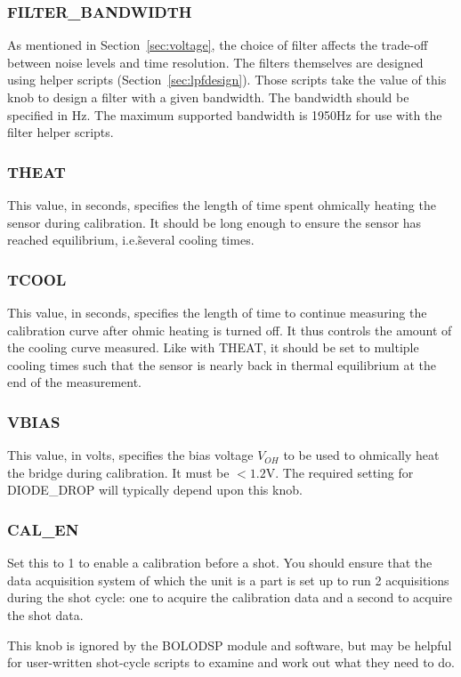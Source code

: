 \documentclass[12pt,a4paper]{article}
\begin{document}
\subsubsection{FILTER{\_}BANDWIDTH}
As mentioned in Section~\ref{sec:voltage}, the choice of filter affects the trade-off between noise levels and time resolution. The filters themselves are
designed using helper scripts (Section~\ref{sec:lpfdesign}). Those scripts take the value of this knob to design a filter with a given bandwidth. The
bandwidth should be specified in Hz. The maximum supported bandwidth is 1950Hz for use with the filter helper scripts.

\subsubsection{THEAT}
This value, in seconds, specifies the length of time spent ohmically heating the sensor during calibration. It should be long enough to ensure the sensor
has reached equilibrium, i.e.\~several cooling times.

\subsubsection{TCOOL}
This value, in seconds, specifies the length of time to continue measuring the calibration curve after ohmic heating is turned off. It thus controls the
amount of the cooling curve measured. Like with THEAT, it should be set to multiple cooling times such that the sensor is nearly back in thermal
equilibrium at the end of the measurement.

\subsubsection{VBIAS}
This value, in volts, specifies the bias voltage $V_{OH}$ to be used to ohmically heat the bridge during calibration. It must be $<1.2\mathrm{V}$. The
required setting for DIODE{\_}DROP will typically depend upon this knob.

\subsubsection{CAL{\_}EN}
Set this to 1 to enable a calibration before a shot. You should ensure that the data acquisition system of which the unit is a part is set up to run 2
acquisitions during the shot cycle: one to acquire the calibration data and a second to acquire the shot data.

This knob is ignored by the BOLODSP module and software, but may be helpful for user-written shot-cycle scripts to examine and work out what they need to
do.
\end{document}
